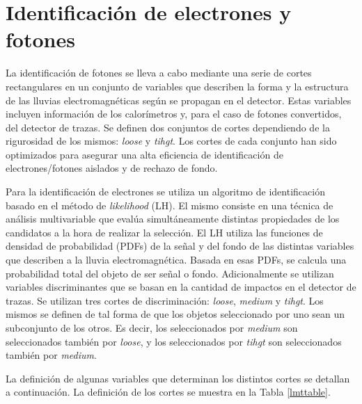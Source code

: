 \section{Identificación de electrones y fotones}

La identificación de fotones se lleva a cabo mediante una serie de cortes rectangulares en un conjunto de variables que describen la forma y la estructura de las lluvias electromagnéticas según se propagan en el detector. Estas variables incluyen información de los calorímetros y, para el caso de fotones convertidos, del detector de trazas. Se definen dos conjuntos de cortes dependiendo de la rigurosidad de los mismos: \textit{loose} y \textit{tihgt}. Los cortes de cada conjunto han sido optimizados para asegurar una alta eficiencia de identificación de electrones/fotones aislados y de rechazo de fondo. 

Para la identificación de electrones se utiliza un algoritmo de identificación basado en el método de \textit{likelihood} (LH). El mismo consiste en una técnica de análisis multivariable que evalúa simultáneamente distintas propiedades de los candidatos a la hora de realizar la selección. El LH utiliza las funciones de densidad de probabilidad (PDFs) de la señal y del fondo de las distintas variables que describen a la lluvia electromagnética. Basada en esas PDFs, se calcula una probabilidad total del objeto de ser señal o fondo. Adicionalmente se utilizan variables discriminantes que se basan en la cantidad de impactos en el detector de trazas. Se utilizan tres cortes de discriminación: \textit{loose}, \textit{medium} y \textit{tihgt}. Los mismos se definen de tal forma de que los objetos seleccionado por uno sean un subconjunto de los otros. Es decir, los seleccionados por \textit{medium} son seleccionados también por \textit{loose}, y los seleccionados por \textit{tihgt} son seleccionados también por \textit{medium}.


La definición de algunas variables que determinan los distintos cortes se detallan a continuación. La definición de los cortes se muestra en la Tabla \ref{lmttable}.


